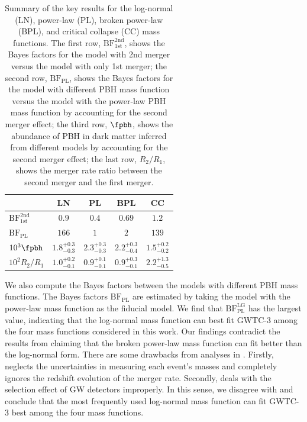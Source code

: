 \documentclass[
reprint,           %
superscriptaddress,%
amsmath,           %
amssymb,           %
aps,               %
prd,               %
notitlepage,       %
longbibliography,  %
floatfix,          %
nofootinbib,
]{revtex4-1}
\begin{document}
\begin{table}[tbp!]
	\centering
	\begin{tabular}{l|c|c|c|c}
		\hline\hline
		& LN & PL & BPL & CC \\
		\hline
		$\mathrm{BF}^{\mathrm{2nd}}_{\mathrm{1st}}$ & $0.9$ & $0.4$ & $0.69$ & $1.2$ \\
		$\mathrm{BF}_{\mathrm{PL}}$ & $166$ & $1$ & $2$ & $139$ \\
		$10^{3}\fpbh$ & $1.8^{+0.3}_{-0.3}$ & $2.3^{+0.3}_{-0.3}$ & $2.2^{+0.3}_{-0.4}$ & $1.5^{+0.2}_{-0.2}$ \\
		$10^{2}R_2/R_1$ & $1.0^{+0.2}_{-0.1}$ & $0.9^{+0.1}_{-0.1}$ & $0.9^{+0.3}_{-0.1}$ & $2.2^{+1.3}_{-0.5}$ \\
		\hline
	\end{tabular}
	\caption{\label{table:BF}Summary of the key results for the log-normal (LN), power-law (PL), broken power-law (BPL), and critical collapse (CC) mass functions. The first row, $\mathrm{BF}^{\mathrm{2nd}}_{\mathrm{1st}}$, shows the Bayes factors for the model with 2nd merger versus the model with only 1st merger; the second row, $\mathrm{BF}_{\mathrm{PL}}$, shows the Bayes factors for the model with different PBH mass function versus the model with the power-law PBH mass function by accounting for the second merger effect; the third row, $\fpbh$, shows the abundance of PBH in dark matter inferred from different models by accounting for the second merger effect; the last row, $R_2/R_1$, shows the merger rate ratio between the second merger and the first merger.}
\end{table}

We also compute the Bayes factors between the models with different PBH mass functions. The Bayes factors $\mathrm{BF}_{\mathrm{PL}}$ are estimated by taking the model with the power-law mass function as the fiducial model. 
We find that $\mathrm{BF}_{\mathrm{PL}}^{\mathrm{LG}}$ has the largest value, indicating that the log-normal mass function can best fit GWTC-3 among the four mass functions considered in this work. Our findings contradict the results from \cite{Deng:2021ezy} claiming that the broken power-law mass function can fit better than the log-normal form. There are some drawbacks from analyses in \cite{Deng:2021ezy}. Firstly, \cite{Deng:2021ezy} neglects the uncertainties in measuring each event's masses and completely ignores the redshift evolution of the merger rate. Secondly, \cite{Deng:2021ezy} deals with the selection effect of GW detectors improperly. In this sense, we disagree with \cite{Deng:2021ezy} and conclude that the most frequently used log-normal mass function can fit GWTC-3 best among the four mass functions.
\end{document}
